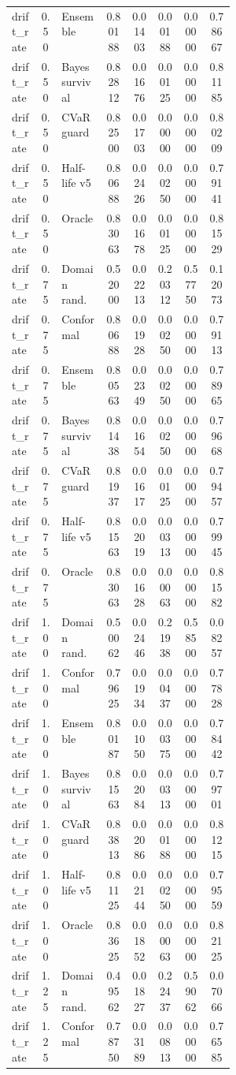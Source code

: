\documentclass{article}
\begin{document}
\begin{center}
\begin{longtable}{p{0.13\linewidth}cp{0.20\linewidth}ccccc}
drift\_rate & 0.50 & Ensemble & 0.80188 & 0.01403 & 0.00188 & 0.00000 & 0.78667\\
drift\_rate & 0.50 & Bayes survival & 0.82812 & 0.01676 & 0.00125 & 0.00000 & 0.81185\\
drift\_rate & 0.50 & CVaR guard & 0.82500 & 0.01703 & 0.00000 & 0.00000 & 0.80209\\
drift\_rate & 0.50 & Half-life v5 & 0.80688 & 0.02426 & 0.00250 & 0.00000 & 0.79141\\
drift\_rate & 0.50 & Oracle & 0.83063 & 0.01678 & 0.00125 & 0.00000 & 0.81529\\
drift\_rate & 0.75 & Domain rand. & 0.52000 & 0.02213 & 0.20312 & 0.57750 & 0.12073\\
drift\_rate & 0.75 & Conformal & 0.80688 & 0.01928 & 0.00250 & 0.00000 & 0.79113\\
drift\_rate & 0.75 & Ensemble & 0.80563 & 0.02349 & 0.00250 & 0.00000 & 0.78965\\
drift\_rate & 0.75 & Bayes survival & 0.81438 & 0.01654 & 0.00250 & 0.00000 & 0.79668\\
drift\_rate & 0.75 & CVaR guard & 0.81937 & 0.01617 & 0.00125 & 0.00000 & 0.79457\\
drift\_rate & 0.75 & Half-life v5 & 0.81563 & 0.02019 & 0.00313 & 0.00000 & 0.79945\\
drift\_rate & 0.75 & Oracle & 0.83063 & 0.01628 & 0.00063 & 0.00000 & 0.81582\\
drift\_rate & 1.00 & Domain rand. & 0.50062 & 0.02446 & 0.21938 & 0.58500 & 0.08257\\
drift\_rate & 1.00 & Conformal & 0.79625 & 0.01934 & 0.00437 & 0.00000 & 0.77828\\
drift\_rate & 1.00 & Ensemble & 0.80187 & 0.01050 & 0.00375 & 0.00000 & 0.78442\\
drift\_rate & 1.00 & Bayes survival & 0.81563 & 0.02084 & 0.00313 & 0.00000 & 0.79701\\
drift\_rate & 1.00 & CVaR guard & 0.83813 & 0.02086 & 0.00188 & 0.00000 & 0.81215\\
drift\_rate & 1.00 & Half-life v5 & 0.81125 & 0.02144 & 0.00250 & 0.00000 & 0.79559\\
drift\_rate & 1.00 & Oracle & 0.83625 & 0.01852 & 0.00063 & 0.00000 & 0.82125\\
drift\_rate & 1.25 & Domain rand. & 0.49562 & 0.01827 & 0.22437 & 0.59062 & 0.07066\\
drift\_rate & 1.25 & Conformal & 0.78750 & 0.03189 & 0.00813 & 0.00000 & 0.76585\\

\end{longtable}
\end{center}
\end{document}
